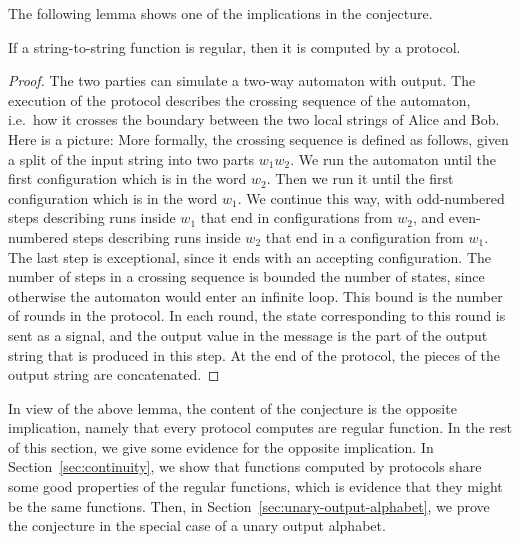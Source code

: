     The following lemma shows one of the implications in the conjecture.

\begin{lemma}\label{lem:from-regular-to-protocol}
    If a string-to-string function is regular, then it is computed by a protocol.
\end{lemma}
\begin{proof}
    The two parties can simulate a two-way automaton with output. The execution of the protocol describes the crossing sequence of the automaton, i.e.~how it crosses the boundary between the two local strings of Alice and Bob. Here is a picture: 
    More formally, the crossing sequence is defined as follows, given  a split of the input string into two parts $w_1 w_2$. We run the automaton until the first configuration which is in the word $w_2$. Then we run it until the first configuration which is in the word $w_1$. We continue this way, with odd-numbered steps describing runs inside $w_1$ that end in  configurations from $w_2$, and even-numbered steps describing runs inside $w_2$ that end in a configuration from $w_1$. The last step is exceptional, since it ends with an accepting configuration. 
    The number of steps in a crossing sequence is bounded  the number of states, since otherwise the automaton would enter an infinite loop. This bound is the number of rounds in the protocol. In each round, the state corresponding to this round is sent as a signal, and the output value in the message is the  part of the output string that is produced in this  step. At the end of the protocol, the pieces of the output string are concatenated. 
\end{proof}

In view of the above lemma, the content of the conjecture is the opposite implication, namely that every protocol computes are regular function. In the rest of this section, we give some evidence for the opposite implication. In Section~\ref{sec:continuity}, we show that functions computed by protocols share some good properties of the regular functions, which is evidence that they might be the same functions. Then,  in Section~\ref{sec:unary-output-alphabet}, we prove the conjecture in the special case of a unary output alphabet. 


